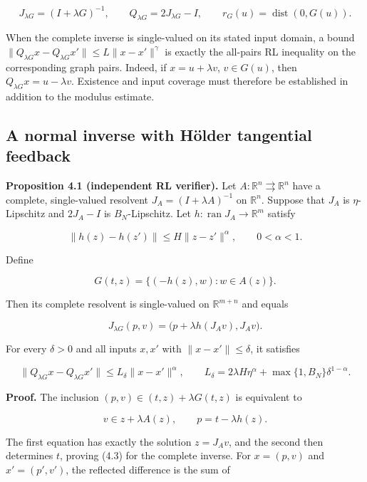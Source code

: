 \documentclass[11pt,a4paper]{article}
\theoremstyle{plain}
\theoremstyle{definition}
\theoremstyle{remark}
\begin{document}
\[
J_{\lambda G}=(I+\lambda G)^{-1},\qquad
Q_{\lambda G}=2J_{\lambda G}-I,\qquad
r_G(u)=\operatorname{dist}(0,G(u)).
\]

When the complete inverse is single-valued on its stated input domain, a
bound \(\|Q_{\lambda G}x-Q_{\lambda G}x'\|\le L\|x-x'\|^\gamma\) is
exactly the all-pairs RL inequality on the corresponding graph pairs.
Indeed, if \(x=u+\lambda v\), \(v\in G(u)\), then
\(Q_{\lambda G}x=u-\lambda v\). Existence and input coverage must
therefore be established in addition to the modulus estimate.

\hypertarget{a-normal-inverse-with-huxf6lder-tangential-feedback}{%
\subsection{A normal inverse with Hölder tangential
feedback}\label{a-normal-inverse-with-huxf6lder-tangential-feedback}}

\textbf{Proposition 4.1 (independent RL verifier).} Let
\(A:\mathbb R^n\rightrightarrows\mathbb R^n\) have a complete,
single-valued resolvent \(J_A=(I+\lambda A)^{-1}\) on \(\mathbb R^n\).
Suppose that \(J_A\) is \(\eta\)-Lipschitz and \(2J_A-I\) is
\(B_N\)-Lipschitz. Let \(h:\operatorname{ran}J_A\to\mathbb R^m\) satisfy

\[
\|h(z)-h(z')\|\le H\|z-z'\|^\alpha,
\qquad 0<\alpha<1.
\tag{4.1}
\]

Define

\[
G(t,z)=\{(-h(z),w):w\in A(z)\}.
\tag{4.2}
\]

Then its complete resolvent is single-valued on \(\mathbb R^{m+n}\) and
equals

\[
J_{\lambda G}(p,v)=\bigl(p+\lambda h(J_Av),J_Av\bigr).
\tag{4.3}
\]

For every \(\delta>0\) and all inputs \(x,x'\) with
\(\|x-x'\|\le\delta\), it satisfies

\[
\|Q_{\lambda G}x-Q_{\lambda G}x'\|
\le L_\delta\|x-x'\|^\alpha,
\qquad
L_\delta=2\lambda H\eta^\alpha+
\max\{1,B_N\}\delta^{1-\alpha}.
\tag{4.4}
\]

\textbf{Proof.} The inclusion \((p,v)\in(t,z)+\lambda G(t,z)\) is
equivalent to

\[
v\in z+\lambda A(z),\qquad p=t-\lambda h(z).
\]

The first equation has exactly the solution \(z=J_Av\), and the second
then determines \(t\), proving (4.3) for the complete inverse. For
\(x=(p,v)\) and \(x'=(p',v')\), the reflected difference is the sum of
\end{document}
